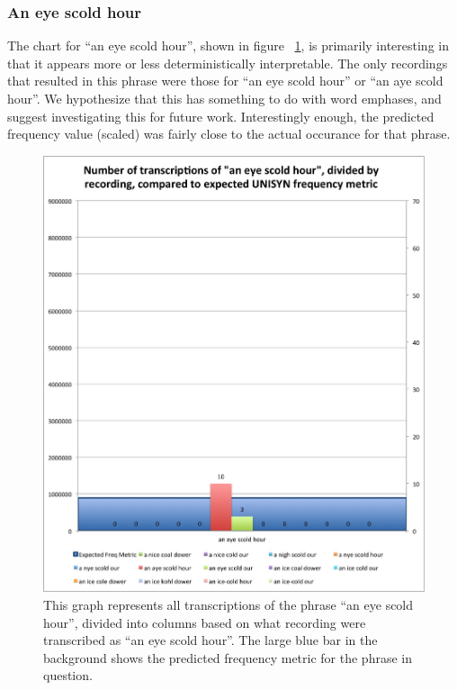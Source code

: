 \subsubsection{An eye scold hour}
\label{results:transcriptionCountPerRecording:an_eye_scold_hour}

The chart for ``an eye scold hour'', shown in figure ~\ref{fig:results:transcriptionCountPerRecordingAnEyeScoldHour}, is primarily interesting in that it appears more or less deterministically interpretable. The only recordings that resulted in this phrase were those for ``an eye scold hour'' or ``an aye scold hour''. We hypothesize that this has something to do with word emphases, and suggest investigating this for future work. Interestingly enough, the predicted frequency value (scaled) was fairly close to the actual occurance for that phrase.


\begin{figure}
\includegraphics[width=\textwidth]{TranscriptionCountPerRecording_anEyeScoldHour.jpg}
\captionfonts
\caption[Transcription Count Per Recording for the transcribed phrase ``an eye scold hour'']{ This graph represents all transcriptions of the phrase ``an eye scold hour'', divided into columns based on what recording were transcribed as ``an eye scold hour''. The large blue bar in the background shows the predicted frequency metric for the phrase in question.}
\label{fig:results:transcriptionCountPerRecordingAnEyeScoldHour}
\end{figure}

